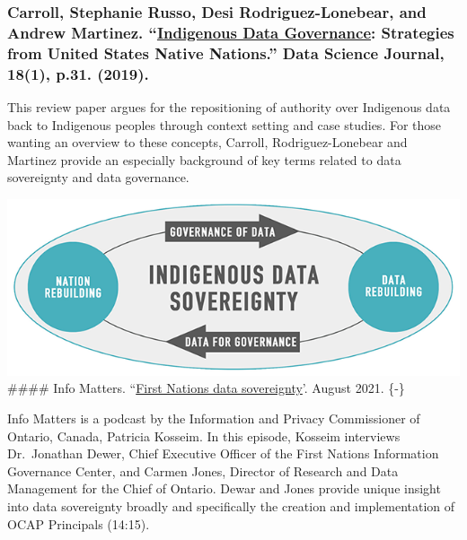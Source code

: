 \documentclass[
]{book}
\begin{document}
\hypertarget{carroll-stephanie-russo-desi-rodriguez-lonebear-and-andrew-martinez.-indigenous-data-governance-strategies-from-united-states-native-nations.-data-science-journal-181-p.31.-2019.}{%
\subsubsection*{\texorpdfstring{Carroll, Stephanie Russo, Desi Rodriguez-Lonebear, and Andrew Martinez. ``\href{https://datascience.codata.org/articles/10.5334/dsj-2019-031/}{Indigenous Data Governance}: Strategies from United States Native Nations.'' Data Science Journal, 18(1), p.31. (2019).}{Carroll, Stephanie Russo, Desi Rodriguez-Lonebear, and Andrew Martinez. ``Indigenous Data Governance: Strategies from United States Native Nations.'' Data Science Journal, 18(1), p.31. (2019).}}\label{carroll-stephanie-russo-desi-rodriguez-lonebear-and-andrew-martinez.-indigenous-data-governance-strategies-from-united-states-native-nations.-data-science-journal-181-p.31.-2019.}}

This review paper argues for the repositioning of authority over Indigenous data back to Indigenous peoples through context setting and case studies. For those wanting an overview to these concepts, Carroll, Rodriguez-Lonebear and Martinez provide an especially background of key terms related to data sovereignty and data governance.

\includegraphics{images/download.png}
\#\#\#\# Info Matters. ``\href{https://open.spotify.com/episode/7lpJvcWPEX0DJcMjQPTdiK?si=r3AfZ-SbQeu3KrMtPbK6cQ}{First Nations data sovereignty}'. August 2021. \{-\}

Info Matters is a podcast by the Information and Privacy Commissioner of Ontario, Canada, Patricia Kosseim. In this episode, Kosseim interviews Dr.~Jonathan Dewer, Chief Executive Officer of the First Nations Information Governance Center, and Carmen Jones, Director of Research and Data Management for the Chief of Ontario. Dewar and Jones provide unique insight into data sovereignty broadly and specifically the creation and implementation of OCAP Principals (14:15).
\end{document}
